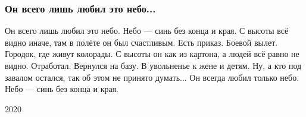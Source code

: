  
 
 

\subsubsection{Он всего лишь любил это небо...}


Он всего лишь любил это небо.
Небо — синь без конца и края.
С высоты всё видно иначе,
там в полёте он был счастливым.
Есть приказ. Боевой вылет.
Городок, где живут колорады.
С высоты он как из картона,
а людей всё равно не видно.
Отработал. Вернулся на базу.
В увольненье к жене и детям.
Ну, а кто под завалом остался,
так об этом не принято думать...
Он всегда любил только небо.
Небо — синь без конца и края.

2020
